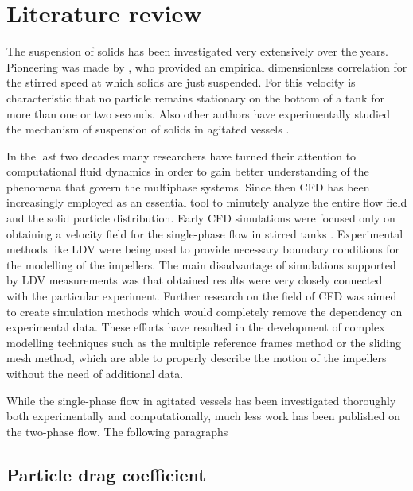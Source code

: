 \chapter{Literature review}
The suspension of solids has been investigated very extensively over the years. Pioneering was made by \citet{zwi58}, who provided an empirical dimensionless correlation for the  stirred speed at which solids are just suspended. For this velocity is characteristic that no particle remains stationary on the bottom of a tank for more than one or two seconds. Also other authors have experimentally studied the mechanism of suspension of solids in agitated vessels \citep{nie68,bal78,arm98}.   

In the last two decades many researchers have turned their attention to computational fluid dynamics in order to gain better understanding of the phenomena that govern the multiphase systems. Since then CFD has been increasingly employed as an essential tool to minutely analyze the entire flow field and the solid particle distribution. Early CFD simulations were focused only on obtaining a velocity field for the single-phase flow in stirred tanks \citep{kre91}. Experimental methods like LDV  were being used to provide necessary boundary conditions for the modelling of the impellers. The main disadvantage of simulations supported by LDV measurements was that obtained results were very closely connected with the particular experiment. Further research on the field of CFD was aimed to create simulation methods which would completely remove the dependency on experimental data. These efforts have resulted in the development of complex modelling techniques such as the multiple reference frames method or the sliding mesh method, which are able to properly describe the motion of the impellers without the need of additional data.  

While the single-phase flow in agitated vessels has been investigated thoroughly both experimentally and computationally, much less work has been published on the two-phase flow. The following paragraphs

              

\section{Particle drag coefficient}


